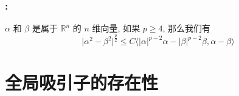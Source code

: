 \documentclass[UTF8]{ctexbeamer}
\newcommand*\abs[1]{\lvert#1\rvert}
\newcommand\R{\mathbb{R}}
\begin{document}




\begin{frame}
    \frametitle{\secname : \subsecname}

    \begin{lemma}\label{lem:VecIneq}
        $\alpha$ 和 $\beta$ 是属于 $\R^{n}$ 的 $n$ 维向量, 如果 $p \geq 4$, 那么我们有
        \begin{equation*}
            \abs{\alpha^2 - \beta^2}^{\frac{p}{2}}
            \leq C \langle \abs{\alpha}^{p-2}\alpha - \abs{\beta}^{p-2}\beta, \alpha-\beta\rangle
        \end{equation*}
    \end{lemma}

\end{frame}

\section{全局吸引子的存在性}
\end{document}
